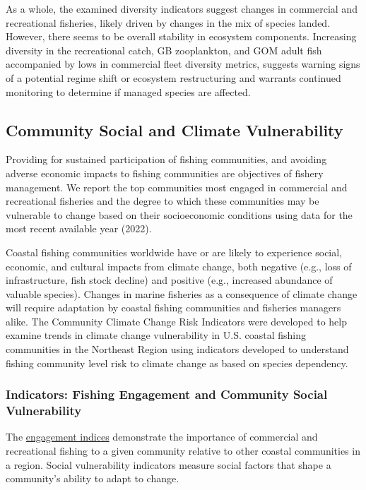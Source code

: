 \documentclass[
  10pt,
]{article}
\begin{document}
As a whole, the examined diversity indicators suggest changes in commercial and recreational fisheries, likely driven by changes in the mix of species landed. However, there seems to be overall stability in ecosystem components. Increasing diversity in the recreational catch, GB zooplankton, and GOM adult fish accompanied by lows in commercial fleet diversity metrics, suggests warning signs of a potential regime shift or ecosystem restructuring and warrants continued monitoring to determine if managed species are affected.

\hypertarget{social-vulnerability}{%
\subsection{Community Social and Climate Vulnerability}\label{social-vulnerability}}

Providing for sustained participation of fishing communities, and avoiding adverse economic impacts to fishing communities are objectives of fishery management. We report the top communities most engaged in commercial and recreational fisheries and the degree to which these communities may be vulnerable to change based on their socioeconomic conditions using data for the most recent available year (2022).

Coastal fishing communities worldwide have or are likely to experience social, economic, and cultural impacts from climate change, both negative (e.g., loss of infrastructure, fish stock decline) and positive (e.g., increased abundance of valuable species). Changes in marine fisheries as a consequence of climate change will require adaptation by coastal fishing communities and fisheries managers alike. The Community Climate Change Risk Indicators were developed to help examine trends in climate change vulnerability in U.S. coastal fishing communities in the Northeast Region using indicators developed to understand fishing community level risk to climate change as based on species dependency.

\hypertarget{indicators-fishing-engagement-and-community-social-vulnerability}{%
\subsubsection{Indicators: Fishing Engagement and Community Social Vulnerability}\label{indicators-fishing-engagement-and-community-social-vulnerability}}

The \href{https://noaa-edab.github.io/catalog/engagement.html}{engagement indices} demonstrate the importance of commercial and recreational fishing to a given community relative to other coastal communities in a region. Social vulnerability indicators measure social factors that shape a community's ability to adapt to change.
\end{document}
